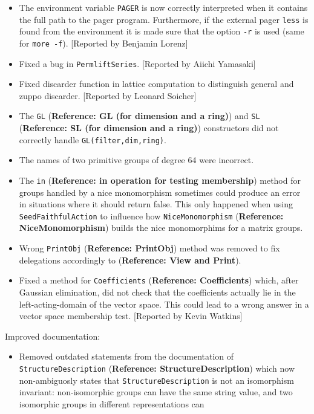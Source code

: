 \documentclass[a4paper,11pt]{report}
\begin{document}
{{\begin{itemize}
compilation. [Reported by Volker Braun] 
\item  The environment variable \texttt{PAGER} is now correctly interpreted when it contains the full path to the pager
program. Furthermore, if the external pager \texttt{less} is found from the environment it is made sure that the option \texttt{-r} is used (same for \texttt{more -f}). [Reported by Benjamin Lorenz] 
\item  Fixed a bug in \texttt{PermliftSeries}. [Reported by Aiichi Yamasaki] 
\item  Fixed discarder function in lattice computation to distinguish general and
zuppo discarder. [Reported by Leonard Soicher] 
\item  The \texttt{GL} (\textbf{Reference: GL (for dimension and a ring)}) and \texttt{SL} (\textbf{Reference: SL (for dimension and a ring)}) constructors did not correctly handle \texttt{GL(filter,dim,ring)}. 
\item  The names of two primitive groups of degree 64 were incorrect. 
\item  The \texttt{\texttt{}in} (\textbf{Reference: \texttt{}in operation for testing membership}) method for groups handled by a nice monomorphism sometimes could produce an
error in situations where it should return false. This only happened when
using \texttt{SeedFaithfulAction} to influence how \texttt{NiceMonomorphism} (\textbf{Reference: NiceMonomorphism}) builds the nice monomorphims for a matrix groups. 
\item  Wrong \texttt{PrintObj} (\textbf{Reference: PrintObj}) method was removed to fix delegations accordingly to  (\textbf{Reference: View and Print}). 
\item  Fixed a method for \texttt{Coefficients} (\textbf{Reference: Coefficients}) which, after Gaussian elimination, did not check that the coefficients
actually lie in the left-acting-domain of the vector space. This could lead to
a wrong answer in a vector space membership test. [Reported by Kevin Watkins] 
\end{itemize}
 Improved documentation: 
\begin{itemize}
\item  Removed outdated statements from the documentation of \texttt{StructureDescription} (\textbf{Reference: StructureDescription}) which now non-ambiguosly states that \texttt{StructureDescription} is not an isomorphism invariant: non-isomorphic groups can have the same
string value, and two isomorphic groups in different representations can

\end{itemize}}}
\end{document}
